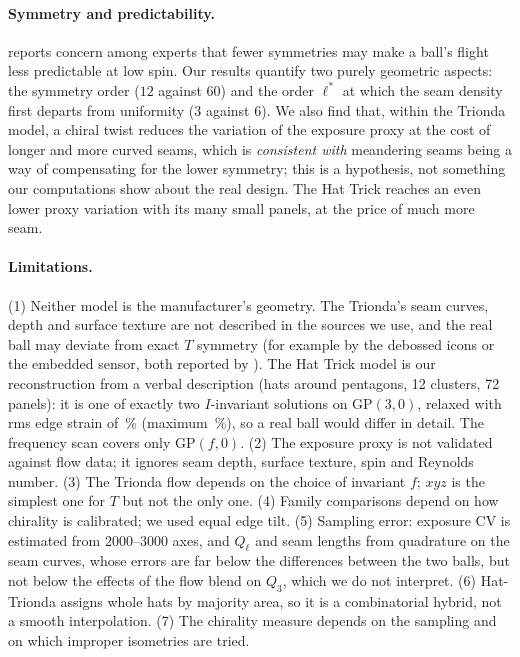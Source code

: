 \documentclass[11pt]{article}
\theoremstyle{definition}
\theoremstyle{remark}
\begin{document}
\paragraph{Symmetry and predictability.}
\citet{hasson_sciam} reports concern among experts that fewer symmetries may make a ball's flight less predictable at low spin. Our results quantify two purely geometric aspects:
the symmetry order ($12$ against $60$) and the order $\ell^*$ at which the seam density first departs from uniformity ($3$ against $6$). We also find that, within the Trionda model, a
chiral twist reduces the variation of the exposure proxy at the cost of longer and more curved seams, which is \emph{consistent with} meandering seams being a way of compensating for
the lower symmetry; this is a hypothesis, not something our computations show about the real design. The Hat Trick reaches an even lower proxy variation with its many small panels, at the price of much more seam.

\paragraph{Limitations.}
(1) Neither model is the manufacturer's geometry. The Trionda's seam curves, depth and surface texture are not described in the sources we use, and the real ball may deviate from exact $T$ symmetry (for example by the debossed icons or the embedded sensor, both reported by \citet{wiki_trionda}). The Hat Trick model is our reconstruction from a verbal description (hats around pentagons, 12 clusters, 72 panels): it is one of exactly two $I$-invariant solutions on $\mathrm{GP}(3,0)$, relaxed with rms edge strain of \htRms\,\% (maximum \htMaxStrain\,\%), so a real ball would differ in detail. The frequency scan covers only $\mathrm{GP}(f,0)$.
(2) The exposure proxy is not validated against flow data; it ignores seam depth, surface texture, spin and Reynolds number. (3) The Trionda flow depends on the choice of invariant $f$; $xyz$ is the simplest
one for $T$ but not the only one. (4) Family comparisons depend on how chirality is calibrated; we used equal edge tilt. (5) Sampling
error: exposure CV is estimated from $2000$--$3000$ axes, and $Q_\ell$ and seam lengths from quadrature on the seam curves, whose errors are far below the differences between the two balls, but not below the effects of the flow blend on $Q_3$, which we do not interpret.
(6) Hat-Trionda assigns whole hats by majority area, so it is a combinatorial hybrid, not a smooth interpolation. (7) The chirality measure depends on the sampling and on which improper isometries are tried.
\end{document}
